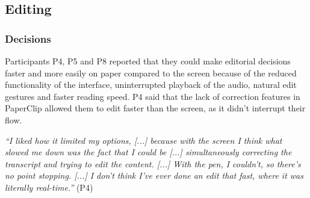 

\subsection{Editing}





\subsubsection{Decisions}
Participants P4, P5 and P8 reported that they could make editorial decisions faster and more easily on paper compared
to the screen because of the reduced functionality of the interface, uninterrupted playback of the audio, natural edit
gestures and faster reading speed.  P4 said that the lack of correction features in PaperClip allowed them to
edit faster than the screen, as it didn't interrupt their flow.

\textit{``I liked how it limited my options, [...]
  because with the screen I think what slowed me down
  was the fact that I could be
  [...] simultaneously correcting the transcript and trying to edit the content. [...]
  With the pen, I couldn't, so there's no point stopping. [...]
  I don't think I've ever done an edit that fast, where it was literally real-time.''} (P4)

